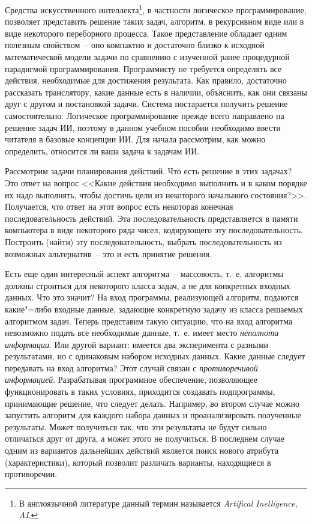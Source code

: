 \documentclass[a4paper,14pt, openany, twoside, draft]{extbook} %
\begin{document}
Средства искусственного интеллекта\footnote{В англоязычной литературе данный термин называется \emph{Artifical Inelligence, AI}.}, в частности логическое программирование, позволяет представить решение таких задач, алгоритм, в рекурсивном виде или в виде некоторого переборного процесса. Такое представление обладает одним полезным свойством~-- оно компактно и достаточно близко к исходной математической модели задачи по сравнению с изученной ранее процедурной парадигмой программирования. Программисту не требуется определять все действия, необходимые для достижения результата. Как правило, достаточно рассказать транслятору, какие данные есть в наличии, объяснить, как они связаны друг с другом и постановкой задачи. Система постарается получить решение самостоятельно. Логическое программирование прежде всего направлено на решение задач ИИ, поэтому в данном учебном пособии необходимо ввести читателя в базовые концепции ИИ. Для начала рассмотрим, как можно определить, относится ли ваша задача к задачам ИИ.

Рассмотрим задачи планирования действий. Что есть решение в этих задачах? Это ответ на вопрос <<Какие действия необходимо выполнить и в каком порядке их надо выполнять, чтобы достичь цели из некоторого начального состояния?>>. Получается, что ответ на этот вопрос есть некоторая конечная последовательность действий. Эта последовательность представляется в памяти компьютера в виде некоторого ряда чисел, кодирующего эту последовательность. Построить (найти) эту последовательность, выбрать последовательность из возможных альтернатив~-- это и есть принятие решения.

Есть еще один интересный аспект алгоритма~-- массовость, т.~е. алгоритмы должны строиться для некоторого класса задач, а не для конкретных входных данных. Что это значит? На вход программы, реализующей алгоритм, подаются какие"=либо входные данные, задающие конкретную задачу из класса решаемых алгоритмом задач. Теперь представим такую ситуацию, что на вход алгоритма невозможно подать все необходимые данные, т.~е. имеет место \emph{неполнота информации}. Или другой вариант: имеется два эксперимента с разными результатами, но с одинаковым набором исходных данных. Какие данные следует передавать на вход алгоритма? Этот случай связан с \emph{противоречивой информацией}. Разрабатывая программное обеспечение, позволяющее функционировать в таких условиях, приходится создавать подпрограммы, принимающие решение, что следует делать. Например, во втором случае можно запустить алгоритм для каждого набора данных и проанализировать полученные результаты. Может получиться так, что эти результаты не будут сильно отличаться друг от друга, а может этого не получиться. В последнем случае одним из вариантов дальнейших действий является поиск нового атрибута (характеристики), который позволит различать варианты, находящиеся в противоречии.
\end{document}
